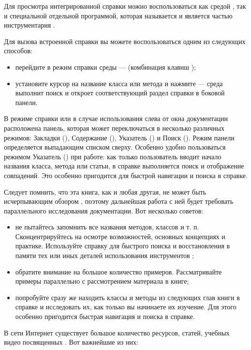 Для просмотра интегрированной справки можно воспользоваться как средой , так и специальной
отдельной программой, которая называется 
и является частью инструментария .

Для  вызова встроенной справки вы можете воспользоваться одним из следующих способов:

\begin{itemize}
\item перейдите в режим справки среды  ---  (комбинация клавиш );
\item установите курсор на название класса или метода и нажмите  --- среда выполнит поиск и откроет
соответствующий раздел справки в боковой панели.
\end{itemize}
В режиме справки или в случае использования  слева от окна документации расположена панель,
которая может переключаться в несколько различных режимов: Закладки (),
Содержание (), Указатель () и Поиск (). Режим панели определяется
выпадающим списком сверху. Особенно удобно пользоваться режимом Указатель () при работе: 
как только пользователь
вводит начало названия класса, метода или статьи, в справке выполняется поиск и отображение совпадений.
Это особенно пригодится для быстрой навигации и поиска в справке.

Следует помнить, что эта книга, как и любая другая, не может быть исчерпывающим обзором , поэтому
дальнейшая работа с ней будет требовать параллельного исследования документации. Вот несколько советов:

\begin{itemize}
\item не пытайтесь запомнить все названия методов, классов и т. п. Сконцентрируйтесь на осмотре
возможностей, основных концепциях и практике. Используйте справку для быстрого поиска и восстановления в памяти тех или
иных деталей использования инструментов ;
\item обратите внимание на большое количество примеров. Рассматривайте примеры параллельно с рассмотрением
материала в книге;
\item попробуйте сразу же находить классы и методы из следующих глав книги в справке и исследовать их, как
только вы начинаете их изучение. Для этого особенно
пригодится быстрая навигация и поиска в справке.
\end{itemize}
В сети Интернет существует большое количество ресурсов, статей, учебных видео посвященных . Вот
важнейшие из них:

